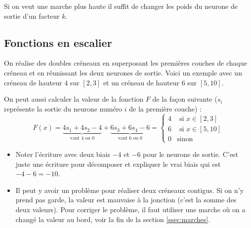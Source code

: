\documentclass[11pt,class=report,crop=false]{standalone}
\begin{document}
Si on veut une marche plus haute il suffit de changer les poids du neurone de sortie d'un facteur $k$.

\begin{center}
\begin{minipage}{0.55\textwidth}
\end{minipage}
\begin{minipage}{0.35\textwidth}
\end{minipage}
\end{center} 

\subsection{Fonctions en escalier}
On réalise des doubles créneaux en superposant les premières couches de chaque créneau et en réunissant les deux neurones de sortie. Voici un exemple avec un créneau de hauteur $4$ sur $[2,3]$ et un créneau de hauteur $6$ sur $[5,10]$.

\begin{center}
\begin{minipage}{0.50\textwidth}
\end{minipage}
\begin{minipage}{0.45\textwidth}
\end{minipage}
\end{center} 


On peut aussi calculer la valeur de la fonction $F$ de la façon suivante ($s_i$ représente la sortie du neurone numéro $i$ de la première couche) :
$$F(x) = \underbrace{4s_1+4s_2-4}_{\text{vaut $4$ ou $0$}} + \underbrace{6s_3+6s_4-6}_{\text{vaut $6$ ou $0$}} = 
\begin{cases}
4 & \text{ si } x \in [2,3] \\
6 & \text{ si } x \in [5,10] \\
0 & \text {sinon}
\end{cases}
$$

\begin{remarque*}
\sauteligne
\begin{itemize}
  \item Noter l'écriture avec deux biais $-4$ et $-6$ pour le neurone de sortie. C'est juste une écriture pour décomposer et expliquer le \og{}vrai\fg{} biais qui est $-4-6 = -10$.

  \item Il peut y avoir un problème pour réaliser deux créneaux contigus. Si on n'y prend pas garde, la valeur est mauvaise à la jonction (c'est la somme des deux valeurs). Pour corriger le problème, il faut utiliser une marche où on a changé la valeur au bord, voir la fin de la section \ref{ssec:marches}.
  
 
\end{itemize}
\end{remarque*} 
\end{document}
